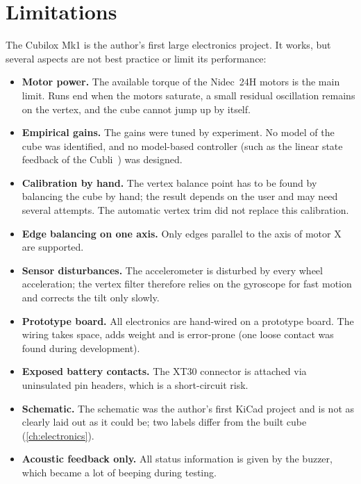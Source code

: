 \chapter{Limitations}
\label{ch:limitations}

The Cubilox Mk1 is the author's first large electronics project. It works, but several aspects
are not best practice or limit its performance:

\begin{itemize}
  \item \textbf{Motor power.} The available torque of the Nidec~24H motors is the main limit. Runs
        end when the motors saturate, a small residual oscillation remains on the vertex, and the
        cube cannot jump up by itself.
  \item \textbf{Empirical gains.} The gains were tuned by experiment. No model of the cube was
        identified, and no model-based controller (such as the linear state feedback of the
        Cubli~\cite{gajamohan2013cubli}) was designed.
  \item \textbf{Calibration by hand.} The vertex balance point has to be found by balancing the cube
        by hand; the result depends on the user and may need several attempts. The automatic
        vertex trim did not replace this calibration.
  \item \textbf{Edge balancing on one axis.} Only edges parallel to the axis of motor X are
        supported.
  \item \textbf{Sensor disturbances.} The accelerometer is disturbed by every wheel acceleration;
        the vertex filter therefore relies on the gyroscope for fast motion and corrects the tilt
        only slowly.
  \item \textbf{Prototype board.} All electronics are hand-wired on a prototype board. The wiring
        takes space, adds weight and is error-prone (one loose contact was found during
        development).
  \item \textbf{Exposed battery contacts.} The XT30 connector is attached via uninsulated pin
        headers, which is a short-circuit risk.
  \item \textbf{Schematic.} The schematic was the author's first KiCad project and is not as clearly
        laid out as it could be; two labels differ from the built cube
        (\cref{ch:electronics}).
  \item \textbf{Acoustic feedback only.} All status information is given by the buzzer, which became
        a lot of beeping during testing.
\end{itemize}
